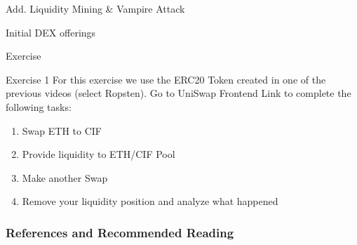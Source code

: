 \documentclass[]{beamer}
\begin{document}
\begin{frame}{Add. Liquidity Mining \& Vampire Attack}

\end{frame}


\begin{frame}{Initial DEX offerings}

\end{frame}


\begin{frame}{Exercise}
	\begin{exercise}{Exercise 1}
	For this exercise we use the ERC20 Token created in one of the previous videos (select Ropsten). Go to UniSwap Frontend Link to complete the following tasks:
	
		\begin{enumerate}
			\item Swap ETH to CIF
			\item Provide liquidity to ETH/CIF Pool
			\item Make another Swap
			\item Remove your liquidity position and analyze what happened
		\end{enumerate}
	\end{exercise}
\end{frame}



\begin{frame}%
\frametitle{References and Recommended Reading}
	
	
	
\end{frame}
\end{document}
